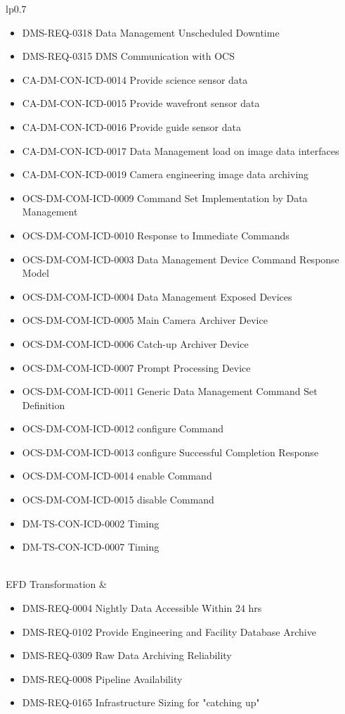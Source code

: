 \begin{xtabular}{lp{0.7\textwidth}}
\begin{itemize}
\item DMS-REQ-0318 Data Management Unscheduled Downtime
\item DMS-REQ-0315 DMS Communication with OCS
\item CA-DM-CON-ICD-0014 Provide science sensor data
\item CA-DM-CON-ICD-0015 Provide wavefront sensor data
\item CA-DM-CON-ICD-0016 Provide guide sensor data
\item CA-DM-CON-ICD-0017 Data Management load on image data interfaces
\item CA-DM-CON-ICD-0019 Camera engineering image data archiving
\item OCS-DM-COM-ICD-0009 Command Set Implementation by Data Management
\item OCS-DM-COM-ICD-0010 Response to Immediate Commands
\item OCS-DM-COM-ICD-0003 Data Management Device Command Response Model
\item OCS-DM-COM-ICD-0004 Data Management Exposed Devices
\item OCS-DM-COM-ICD-0005 Main Camera Archiver Device
\item OCS-DM-COM-ICD-0006 Catch-up Archiver Device
\item OCS-DM-COM-ICD-0007 Prompt Processing Device
\item OCS-DM-COM-ICD-0011 Generic Data Management Command Set Definition
\item OCS-DM-COM-ICD-0012 configure Command
\item OCS-DM-COM-ICD-0013 configure Successful Completion Response
\item OCS-DM-COM-ICD-0014 enable Command
\item OCS-DM-COM-ICD-0015 disable Command
\item DM-TS-CON-ICD-0002 Timing
\item DM-TS-CON-ICD-0007 Timing
\end{itemize} \\ \hline
EFD Transformation &
\begin{itemize}DMS-REQ-0346 Data Availability
\item DMS-REQ-0004 Nightly Data Accessible Within 24 hrs
\item DMS-REQ-0102 Provide Engineering and Facility Database Archive
\item DMS-REQ-0309 Raw Data Archiving Reliability
\item DMS-REQ-0008 Pipeline Availability
\item DMS-REQ-0165 Infrastructure Sizing for "catching up"

\end{itemize}
\end{xtabular}
